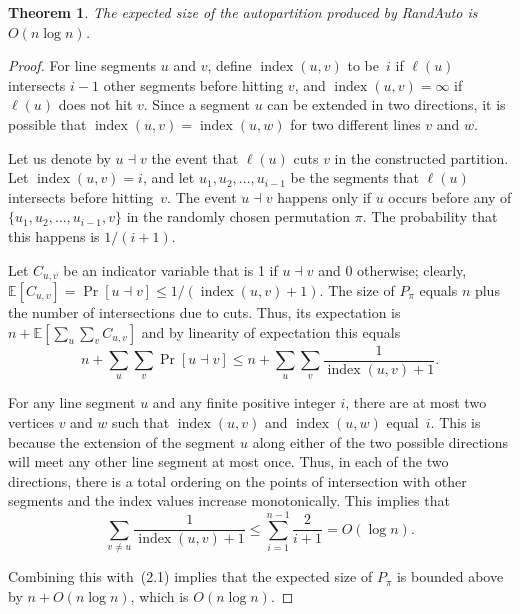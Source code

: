 \documentclass[twoside,12pt]{book}
\theoremstyle{plain}
\newtheorem{theorem}{Theorem}[chapter]
\theoremstyle{definition}
\theoremstyle{remark}
\begin{document}
\begin{theorem}
\label{thm:partition}
The expected size of the autopartition produced by RandAuto is $O(n\log n)$.
\end{theorem}

\begin{proof}
For line segments $u$ and $v$, define $\operatorname{index}(u,v)$ to be~$i$
if $\ell(u)$ intersects $i{-}1$ other segments before hitting $v$, and
$\operatorname{index}(u,v)=\infty$ if $\ell(u)$ does not hit $v$.  Since a
segment $u$ can be extended in two directions, it is possible that
$\operatorname{index}(u,v)=\operatorname{index}(u,w)$ for two different
lines $v$ and $w$.

Let us denote by $u\dashv v$ the event that $\ell(u)$ cuts $v$ in the
constructed partition.  Let $\operatorname{index}(u,v)=i$, and let
$u_1,u_2,\ldots,u_{i-1}$ be the segments that $\ell(u)$ intersects before
hitting~$v$.  The event $u\dashv v$ happens only if $u$ occurs before any
of $\{u_1,u_2,\ldots,u_{i-1},v\}$ in the randomly chosen permutation
$\pi$.  The probability that this happens is $1/(i+1)$.

Let $C_{u,v}$ be an indicator variable that is 1 if $u\dashv v$ and 0
otherwise; clearly,
$\mathbb{E}[C_{u,v}]=\Pr[u\dashv v]\le 1/(\operatorname{index}(u,v)+1)$.
The size of $P_\pi$ equals $n$ plus the number of intersections due to cuts.
Thus, its expectation is
$n+\mathbb{E}[\sum_u\sum_v C_{u,v}]$ and by linearity of expectation this
equals
\begin{equation*}
  n + \sum_u \sum_v \Pr[u\dashv v]
  \le n + \sum_u \sum_v
    \frac{1}{\operatorname{index}(u,v)+1}.
  \tag{2.1}
\end{equation*}

For any line segment $u$ and any finite positive integer $i$, there are at
most two vertices $v$ and $w$ such that $\operatorname{index}(u,v)$ and
$\operatorname{index}(u,w)$ equal~$i$.  This is because the extension of the
segment $u$ along either of the two possible directions will meet any other
line segment at most once.  Thus, in each of the two directions, there is a
total ordering on the points of intersection with other segments and the
index values increase monotonically.  This implies that
\begin{equation*}
  \sum_{v\ne u} \frac{1}{\operatorname{index}(u,v)+1}
  \le \sum_{i=1}^{n-1} \frac{2}{i+1}
  = O(\log n).
  \tag{2.2}
\end{equation*}

Combining this with~(2.1) implies that the expected size of $P_\pi$ is
bounded above by $n+O(n\log n)$, which is $O(n\log n)$.
\end{proof}
\end{document}
